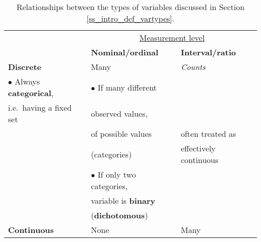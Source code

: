 \begin{table}
\caption{Relationships between the types of variables discussed in
Section
\ref{ss_intro_def_vartypes}.}
\label{t_vartypes}
\vspace*{2ex}
\begin{tabular}{l|l|l|}
\multicolumn{1}{l}{ }
& \multicolumn{2}{c}{\underline{Measurement level}} \\
\multicolumn{1}{l}{ }
& \multicolumn{1}{l}{\rule[-3mm]{0mm}{8mm}\textbf{Nominal/ordinal}} &
\multicolumn{1}{l}{\textbf{Interval/ratio}} \\ \cline{2-3}
\textbf{Discrete} &
Many & \emph{Counts} \\
$\bullet$ Always \textbf{categorical}, &
$\bullet$ If many different \\
i.e.\ having a fixed set &
observed values, \\
&
of possible values &
often treated as \\
&
(categories) &
effectively continuous \\
&
$\bullet$ If only two categories, & \\
&
variable is \textbf{binary} & \\
&
(\textbf{dichotomous}) & \\[1ex] \cline{2-3}
\textbf{Continuous} & None & Many \\
\cline{2-3}
\end{tabular}
\end{table}


